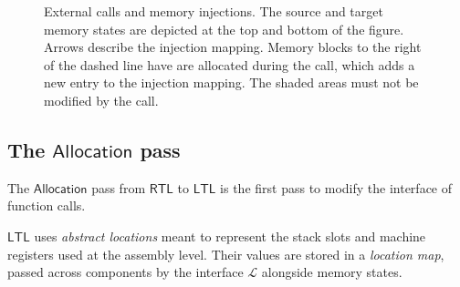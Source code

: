 \documentclass[sigplan,10pt,review,anonymous]{acmart}\settopmatter{printfolios=true,printccs=false,printacmref=false}
\newcommand{\kw}[1]{\ensuremath{ \mathsf{#1} }}
\begin{document}
\begin{figure} %
  \caption{External calls and memory injections.
    The source and target memory states are
    depicted at the top and bottom
    of the figure. Arrows describe the injection mapping.
    Memory blocks to the right of the dashed line
    have are allocated during the call,
    which adds a new entry to the injection mapping.
    The shaded areas must not be modified by the call.
  }
  \label{fig:injp}
\end{figure}


\subsection{The \kw{Allocation} pass} %

The \kw{Allocation} pass from \kw{RTL} to \kw{LTL}
is the first pass to modify the interface of function calls.

\kw{LTL} uses \emph{abstract locations}
meant to represent the stack slots and machine registers
used at the assembly level.
Their values are stored in a \emph{location map},
passed across components by the interface $\mathcal{L}$
alongside memory states.
\end{document}
